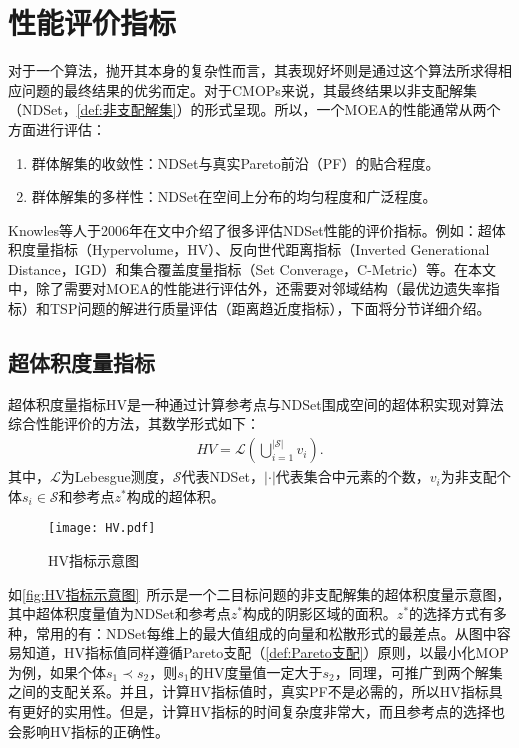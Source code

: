 \section{性能评价指标}
\label{sec:背景介绍:性能评价指标}
对于一个算法，抛开其本身的复杂性而言，其表现好坏则是通过这个算法所求得相应问题的最终结果的优劣而定。对于CMOPs来说，其最终结果以非支配解集（NDSet，\autoref{def:非支配解集}）的形式呈现。所以，一个MOEA的性能通常从两个方面进行评估：
\begin{enumerate}
    \item 群体解集的收敛性：NDSet与真实Pareto前沿（PF）的贴合程度。
    \item 群体解集的多样性：NDSet在空间上分布的均匀程度和广泛程度。
\end{enumerate}
\par
Knowles等人于2006年在文中\cite{knowles2006tutorial}介绍了很多评估NDSet性能的评价指标。例如：超体积度量指标（Hypervolume，HV）\cite{zitzler1999multiobjective}、反向世代距离指标（Inverted Generational Distance，IGD）\cite{czyzzak1998pareto}和集合覆盖度量指标（Set Converage，C-Metric）\cite{zitzler1999multiobjective}等。在本文中，除了需要对MOEA的性能进行评估外，还需要对邻域结构（最优边遗失率指标\cite{helsgaun2018using}）和TSP问题的解进行质量评估（距离趋近度指标\cite{helsgaun2018using}），下面将分节详细介绍。

\subsection{超体积度量指标}
\label{subsec:背景介绍:性能评价指标:超体积度量指标}
超体积度量指标HV是一种通过计算参考点与NDSet围成空间的超体积实现对算法综合性能评价的方法，其数学形式如下：
\begin{align}
    \label{eq:HV}
    HV = \mathcal{L} (\bigcup_{i=1}^{|\mathcal{S}|} v_i).
\end{align}
其中，$\mathcal{L}$为Lebesgue测度，$\mathcal{S}$代表NDSet，$| \cdot  \vert $代表集合中元素的个数，$v_i$为非支配个体$s_i \in \mathcal{S}$和参考点$z^*$构成的超体积。
\begin{figure}[htb]
    \texttt{[image: HV.pdf]}
    \caption[HV指标示意图]{HV指标示意图}
    \label{fig:HV指标示意图}
\end{figure}
\par
如\autoref{fig:HV指标示意图}~所示是一个二目标问题的非支配解集的超体积度量示意图，其中超体积度量值为NDSet和参考点$z^*$构成的阴影区域的面积。$z^*$的选择方式有多种，常用的有：NDSet每维上的最大值组成的向量和松散形式的最差点\cite{deb2010toward}。从图中容易知道，HV指标值同样遵循Pareto支配（\autoref{def:Pareto支配}）原则，以最小化MOP为例，如果个体$s_1 \prec s_2$，则$s_1$的HV度量值一定大于$s_2$，同理，可推广到两个解集之间的支配关系。并且，计算HV指标值时，真实PF不是必需的，所以HV指标具有更好的实用性。但是，计算HV指标的时间复杂度非常大，而且参考点的选择也会影响HV指标的正确性\cite{zheng2007mop}。

